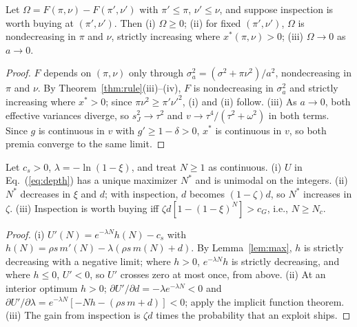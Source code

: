 \documentclass[acmsmall,screen,review,anonymous]{acmart}
\theoremstyle{acmdefinition}
\begin{document}
\begin{corollary}\label{cor:omega}
Let $\Omega = F(\pi,\nu) - F(\pi',\nu')$ with $\pi' \le \pi$, $\nu' \le \nu$, and suppose inspection is worth buying at $(\pi',\nu')$. Then (i) $\Omega \ge 0$; (ii) for fixed $(\pi',\nu')$, $\Omega$ is nondecreasing in $\pi$ and $\nu$, strictly increasing where $x^*(\pi,\nu) > 0$; (iii) $\Omega \to 0$ as $a \to 0$.
\end{corollary}
\begin{proof}
$F$ depends on $(\pi,\nu)$ only through $\sigma_a^2 = (\sigma^2 + \pi\nu^2)/a^2$, nondecreasing in $\pi$ and $\nu$. By Theorem~\ref{thm:rule}(iii)--(iv), $F$ is nondecreasing in $\sigma_a^2$ and strictly increasing where $x^* > 0$; since $\pi\nu^2 \ge \pi'\nu'^2$, (i) and (ii) follow. (iii) As $a \to 0$, both effective variances diverge, so $s_J^2 \to \tau^2$ and $v \to \tau^4/(\tau^2+\omega^2)$ in both terms. Since $g$ is continuous in $v$ with $g' \ge 1 - \delta > 0$, $x^*$ is continuous in $v$, so both premia converge to the same limit.
\end{proof}

\begin{theorem}\label{thm:depth}
Let $c_s > 0$, $\lambda = -\ln(1-\xi)$, and treat $N \ge 1$ as continuous. (i) $U$ in Eq.~(\ref{eq:depth}) has a unique maximizer $N^*$ and is unimodal on the integers. (ii) $N^*$ decreases in $\xi$ and $d$; with inspection, $d$ becomes $(1-\zeta)d$, so $N^*$ increases in $\zeta$. (iii) Inspection is worth buying iff $\zeta d[1-(1-\xi)^N] > c_G$, i.e., $N \ge N_c$.
\end{theorem}
\begin{proof}
(i) $U'(N) = e^{-\lambda N}h(N) - c_s$ with $h(N) = \rho s\,m'(N) - \lambda(\rho s\,m(N) + d)$. By Lemma~\ref{lem:max}, $h$ is strictly decreasing with a negative limit; where $h > 0$, $e^{-\lambda N}h$ is strictly decreasing, and where $h \le 0$, $U' < 0$, so $U'$ crosses zero at most once, from above. (ii) At an interior optimum $h > 0$; $\partial U'/\partial d = -\lambda e^{-\lambda N} < 0$ and $\partial U'/\partial\lambda = e^{-\lambda N}[-Nh - (\rho s\,m + d)] < 0$; apply the implicit function theorem. (iii) The gain from inspection is $\zeta d$ times the probability that an exploit ships.
\end{proof}
\end{document}
